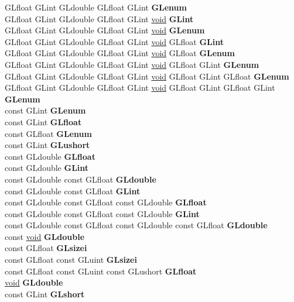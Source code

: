\begin{DoxyCompactItemize}
\begin{tabbing}
\>GLfloat GLint GLdouble GLfloat GLint {\bfseries GLenum}\\
\>GLfloat GLint GLdouble GLfloat GLint \hyperlink{interfacevoid}{void} {\bfseries GLint}\\
\>GLfloat GLint GLdouble GLfloat GLint \hyperlink{interfacevoid}{void} {\bfseries GLenum}\\
\>GLfloat GLint GLdouble GLfloat GLint \hyperlink{interfacevoid}{void} GLfloat {\bfseries GLint}\\
\>GLfloat GLint GLdouble GLfloat GLint \hyperlink{interfacevoid}{void} GLfloat {\bfseries GLenum}\\
\>GLfloat GLint GLdouble GLfloat GLint \hyperlink{interfacevoid}{void} GLfloat GLint {\bfseries GLenum}\\
\>GLfloat GLint GLdouble GLfloat GLint \hyperlink{interfacevoid}{void} GLfloat GLint GLfloat {\bfseries GLenum}\\
\>GLfloat GLint GLdouble GLfloat GLint \hyperlink{interfacevoid}{void} GLfloat GLint GLfloat GLint {\bfseries GLenum}\\
\>const GLint {\bfseries GLenum}\\
\>const GLint {\bfseries GLfloat}\\
\>const GLfloat {\bfseries GLenum}\\
\>const GLint {\bfseries GLushort}\\
\>const GLdouble {\bfseries GLfloat}\\
\>const GLdouble {\bfseries GLint}\\
\>const GLdouble const GLfloat {\bfseries GLdouble}\\
\>const GLdouble const GLfloat {\bfseries GLint}\\
\>const GLdouble const GLfloat const GLdouble {\bfseries GLfloat}\\
\>const GLdouble const GLfloat const GLdouble {\bfseries GLint}\\
\>const GLdouble const GLfloat const GLdouble const GLfloat {\bfseries GLdouble}\\
\>const \hyperlink{interfacevoid}{void} {\bfseries GLdouble}\\
\>const GLfloat {\bfseries GLsizei}\\
\>const GLfloat const GLuint {\bfseries GLsizei}\\
\>const GLfloat const GLuint const GLushort {\bfseries GLfloat}\\
\>\hyperlink{interfacevoid}{void} {\bfseries GLdouble}\\
\>const GLint {\bfseries GLshort}\\

\end{tabbing}
\end{DoxyCompactItemize}
